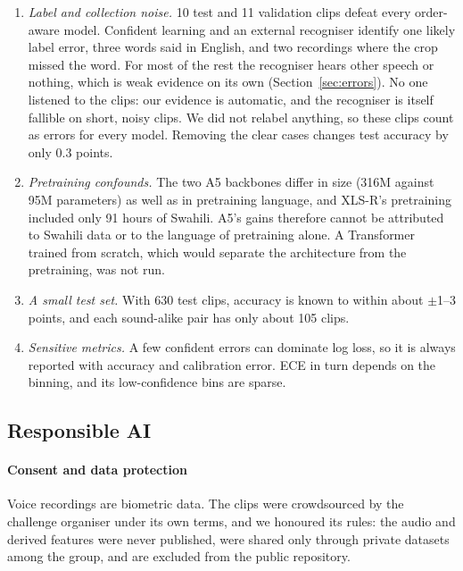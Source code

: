 \begin{enumerate}
        close (0.004). We did not retune the patience after seeing the seed runs, to avoid selecting on validation
        once more.
  \item \emph{Label and collection noise.} 10 test and 11 validation clips defeat every order-aware model. Confident
        learning and an external recogniser identify one likely label error, three words said in English, and two
        recordings where the crop missed the word. For most of the rest the recogniser hears other speech or
        nothing, which is weak evidence on its own (Section~\ref{sec:errors}). No one listened to the clips: our
        evidence is automatic, and the recogniser is itself fallible on short, noisy clips. We did not relabel anything, so these clips count as errors for every
        model. Removing the clear cases changes test accuracy by only 0.3 points.
  \item \emph{Pretraining confounds.} The two A5 backbones differ in size (316M against 95M parameters) as well as
        in pretraining language, and XLS-R's pretraining included only 91 hours of Swahili. A5's gains therefore
        cannot be attributed to Swahili data or to the language of pretraining alone. A Transformer trained from
        scratch, which would separate the architecture from the pretraining, was not run.
  \item \emph{A small test set.} With 630 test clips, accuracy is known to within about $\pm$1--3 points, and
        each sound-alike pair has only about 105 clips.
  \item \emph{Sensitive metrics.} A few confident errors can dominate log loss, so it is always reported with
        accuracy and calibration error. ECE in turn depends on the binning, and its low-confidence bins are sparse.
\end{enumerate}

\subsection{Responsible AI}
\paragraph{Consent and data protection}
Voice recordings are biometric data. The clips were crowdsourced by the challenge organiser under its own terms,
and we honoured its rules: the audio and derived features were never published, were shared only through private
datasets among the group, and are excluded from the public repository.

